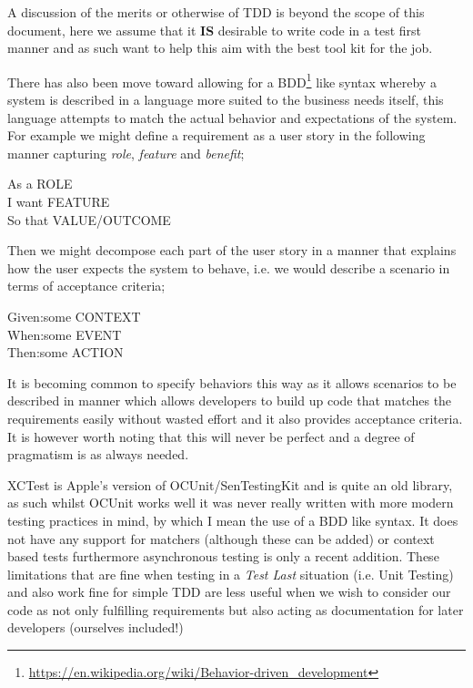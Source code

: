 \documentclass[a4paper, titlepage]{article}
\begin{document}
  A discussion of the merits or otherwise of TDD is beyond the scope of
  this document, here we assume that it \textbf{IS} desirable to write
  code in a test first manner and as such want to help this aim with the best
  tool kit for the job.
  
  There has also been move toward allowing for a 
  BDD\footnote{\url{https://en.wikipedia.org/wiki/Behavior-driven_development}} 
  like syntax whereby a system is
  described in a language more suited to the business needs itself, this
  language attempts to match the actual behavior and expectations of
  the system.\\For example we might define a requirement as a user
  story in the following manner capturing \textit{role},
  \textit{feature} and \textit{benefit};

  \begin{spec}{0.5}
    \ac{As a }{ROLE}\\
    \ac{I want }{FEATURE}\\
    \ac{So that }{VALUE/OUTCOME}
  \end{spec}

  Then we might decompose each part of the user story in a
  manner that explains how the user expects the system to behave, i.e. we
  would describe a scenario in terms of acceptance criteria;

  \begin{spec}{0.5}
    \ac{Given:}{some CONTEXT}\\
    \ac{When:}{some EVENT}\\
    \ac{Then:}{some ACTION}
  \end{spec}

  It is becoming common to specify behaviors this way as it allows
  scenarios to be described in manner which allows developers to build
  up code that matches the requirements easily without wasted effort and
  it also provides acceptance criteria. It is however worth noting that
  this will never be perfect and a degree of pragmatism is as always
  needed.
  
  XCTest is Apple's version of OCUnit/SenTestingKit and is quite an
  old library,
  as such whilst OCUnit works well it was never really written with more
  modern testing practices in mind, by which I mean the use of a BDD like syntax. It does
  not have any support for matchers (although these can be added) or context based tests furthermore
  asynchronous testing is only a recent addition. These 
  limitations that are fine when testing in a \textit{Test Last}
  situation (i.e. Unit Testing) and also work fine for simple
  TDD are less useful when we wish to consider our code as not only
  fulfilling requirements but also acting as documentation for later
  developers (ourselves included!)\\
\end{document}
